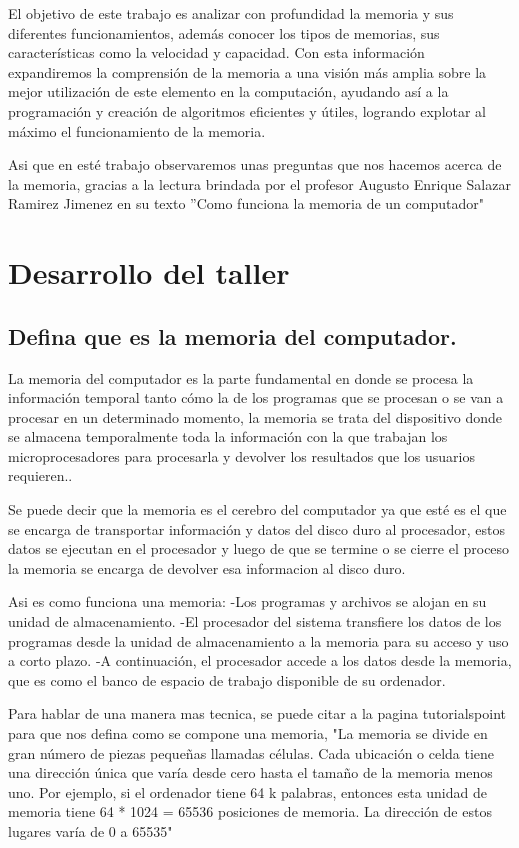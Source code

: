 \documentclass{article}
\begin{document}
El objetivo de este trabajo es analizar con profundidad la memoria y sus diferentes funcionamientos, además conocer los tipos de memorias, sus características como la velocidad y capacidad. Con esta información expandiremos la comprensión de la memoria a una visión más amplia sobre la mejor utilización de este elemento en la computación, ayudando así a la programación y creación de algoritmos eficientes y útiles, logrando explotar al máximo el funcionamiento de la memoria.

Asi que en esté trabajo observaremos unas preguntas que nos hacemos acerca de la memoria, gracias a la  lectura  brindada por el profesor Augusto  Enrique  Salazar  Ramirez  Jimenez  en  su  texto \cite{funcionamiento} ”Como  funciona  la  memoria  de  un computador"
\newpage


\section{Desarrollo del taller} \label{contenido}

\subsection{Defina que es la memoria del computador.}
La memoria del computador es la parte fundamental en donde se procesa la información temporal tanto cómo la de los programas que se procesan o se van a procesar en un determinado momento, la memoria se trata del dispositivo donde se almacena temporalmente toda la información con la que trabajan los microprocesadores para procesarla y devolver los resultados que los usuarios requieren..

Se puede decir que la memoria es el cerebro del computador ya que esté es el que se encarga de transportar información y datos del disco duro al procesador, estos datos se ejecutan en el procesador y luego de que se termine o se cierre el proceso la memoria se encarga de devolver esa informacion al disco duro.

Asi es como funciona una memoria:
-Los programas y archivos se alojan en su unidad de almacenamiento.
-El procesador del sistema transfiere los datos de los programas desde la unidad de almacenamiento a la memoria para su acceso y uso a corto plazo.
-A continuación, el procesador accede a los datos desde la memoria, que es como el banco de espacio de trabajo disponible de su ordenador.

Para hablar de una manera mas tecnica, se puede citar a la pagina tutorialspoint para que nos defina como se compone una memoria, \cite{Memoria} "La memoria se divide en gran número de piezas pequeñas llamadas células. Cada ubicación o celda tiene una dirección única que varía desde cero hasta el tamaño de la memoria menos uno. Por ejemplo, si el ordenador tiene 64 k palabras, entonces esta unidad de memoria tiene 64 * 1024 = 65536 posiciones de memoria. La dirección de estos lugares varía de 0 a 65535"
\end{document}
